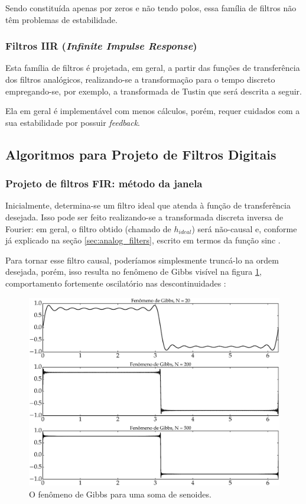 Sendo constituída apenas por zeros e não tendo polos, essa família de filtros não têm problemas de estabilidade. 

\subsubsection{Filtros IIR (\textit{Infinite Impulse Response})}
Esta família de filtros é projetada, em geral, a partir das funções de transferência dos filtros analógicos, realizando-se a transformação para o tempo discreto empregando-se, por exemplo, a transformada de Tustin que será descrita a seguir.

Ela em geral é implementável com menos cálculos, porém, requer cuidados com a sua estabilidade por possuir \textit{feedback}. 

\subsection{Algoritmos para Projeto de Filtros Digitais}

\subsubsection{Projeto de filtros FIR: método da janela}

Inicialmente, determina-se um filtro ideal que atenda à função de transferência desejada. Isso pode ser feito realizando-se a transformada discreta inversa de Fourier: em geral, o filtro obtido (chamado de $h_{ideal}$) será não-causal e, conforme já explicado na seção \ref{sec:analog_filters}, escrito em termos da função sinc \cite{haykin}. 

Para tornar esse filtro causal, poderíamos simplesmente truncá-lo na ordem desejada, porém, isso resulta no fenômeno de Gibbs visível na figura \ref{fig:gibbs}, comportamento fortemente oscilatório nas descontinuidades \cite{haykin}:

\begin{figure}[H]
  \centering
  \includegraphics[scale=0.5]{images/plots/gibbs}
  \caption{O fenômeno de Gibbs para uma soma de senoides.}
  \label{fig:gibbs}
\end{figure}


